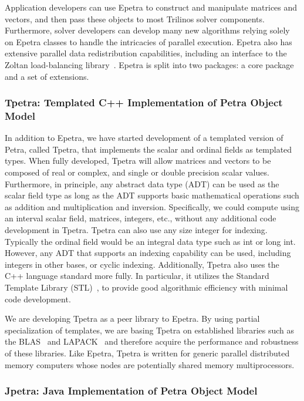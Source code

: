 \documentclass[12pt,relax]{TrilinosOverview}
\begin{document}
Application developers can use Epetra to construct and manipulate matrices
and vectors, and then pass these objects to most Trilinos solver components.
Furthermore, solver developers can develop many new algorithms relying 
solely on Epetra classes to handle the intricacies of parallel execution.  
Epetra also has extensive parallel data  redistribution capabilities, 
including an interface to the Zoltan load-balancing
library~\cite{zoltan-ug}.  Epetra is split into two packages:  a core
package and a set of extensions.

\subsubsection{Tpetra: Templated C++ Implementation of Petra Object Model}

In addition to Epetra, we have started development of a templated 
version of Petra, called Tpetra, that implements the scalar and 
ordinal fields as templated types.  When fully developed, Tpetra 
will allow matrices and vectors to be composed of real or complex, 
and single or double precision scalar values.  Furthermore, in 
principle, any abstract data type (ADT) can be used as the scalar 
field type as long as the ADT supports basic mathematical operations 
such as addition and multiplication and inversion. Specifically, we 
could compute using an interval scalar field, matrices, integers, etc., 
without any additional code development in Tpetra.  Tpetra can also 
use any size integer for indexing.  Typically the ordinal field would 
be an integral data type such as int or long int.  However, any ADT 
that supports an indexing capability can be used, including integers in 
other bases, or cyclic indexing. Additionally, Tpetra also uses the 
C++ language standard more fully.  In particular, it utilizes the 
Standard Template Library (STL)~\cite{Stroustrup}, to provide good 
algorithmic efficiency with minimal code development.

We are developing Tpetra as a peer library to Epetra. By using partial
specialization of templates, we are basing Tpetra on established libraries 
such as the BLAS~\cite{BLAS1,BLAS2,BLAS3} and LAPACK~\cite{lapack} and 
therefore acquire the performance and robustness of these libraries.
Like Epetra, Tpetra is written for generic parallel distributed
memory computers whose nodes are
potentially shared memory multiprocessors.

\subsubsection{Jpetra: Java Implementation of Petra Object Model}
\end{document}

